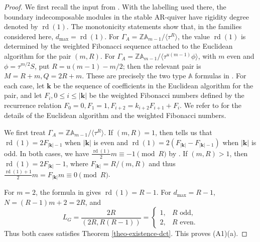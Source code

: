 \documentclass[12pt]{article}
\theoremstyle{plain}
\theoremstyle{definition}
\DeclareMathOperator{\rd}{rd}
\renewcommand{\leq}{\leqslant}
\begin{document}
\begin{proof}
We first recall the input from \cite{HuYinRigidityDegrees}.  With the
labelling used there, the boundary indecomposable modules in the stable
AR-quiver have rigidity degree denoted by \(\rd(1)\).  The monotonicity
statements \cite[Proposition 4.3(3), Corollary 4.7]{HuYinRigidityDegrees}
show that, in the families considered here, \(d_{\max}=\rd(1)\).  For
\(\Gamma_A=\mathbb Z\mathbb A_{m-1}/\langle\tau^R\rangle\), the value
\(\rd(1)\) is determined by the weighted Fibonacci sequence attached to the
Euclidean algorithm for the pair \((m,R)\).  For
\(\Gamma_A=\mathbb Z\mathbb A_{m-1}/
\langle\tau^{u(m-1)}\phi\rangle\), with \(m\) even and
\(\phi=\tau^{m/2}S\), put \(R=u(m-1)-m/2\); then the relevant pair is
\(
M=R+m,Q=2R+m\).
These are precisely the two type \(\mathbb A\) formulas in
\cite[Theorem 4.1]{HuYinRigidityDegrees}. For each case, let $\mathbf{k}$ be the sequence of coefficients in the Euclidean algorithm for the pair, and let \(F_i, 0\leq i\leq |\mathbf{k}|\) be the weighted Fibonacci numbers defined by the recurrence relation \(F_0=0, F_1=1, F_{i+2}=k_{i+2}F_{i+1}+F_i\). We refer to \cite{HuYinRigidityDegrees} for the details of the Euclidean algorithm and the weighted Fibonacci numbers.






We first treat \(\Gamma_A=\mathbb Z\mathbb A_{m-1}/\langle\tau^R\rangle\).  If $(m,R)=1$,  then \cite[Theorem 4.1]{HuYinRigidityDegrees} tells us that \(\rd(1)=2F_{|\mathbf{k}|-1}\) when $|\mathbf{k}|$ is even and \(\rd(1)=2(F_{|\mathbf{k}|}-F_{|\mathbf{k}|-1})\) when $|\mathbf{k}|$ is odd. In both cases, we have  \(\frac{\rd(1)}{2}m\equiv -1\pmod{R}\) by  \cite[Proposition 3.4]{HuYinRigidityDegrees}. If \((m,R)>1\), then \(\rd(1)=2F_{|\mathbf{k}|}-1\), where $F_{|\mathbf{k}|}=R/(m,R)$ and thus \(\frac{\rd(1)+1}{2}m=F_{|\mathbf{k}|}m\equiv 0\pmod{R}\). 









For \(m=2\), the formula in \cite[Theorem 4.1]{HuYinRigidityDegrees} gives
\(\rd(1)=R-1\). For $d_{\max}=R-1$, $N=(R-1)m+2=2R$, and 
\[
L_G=\frac{2R}{(2R,R(R-1))}=
\begin{cases}
1,&R\text{ odd},\\
2,&R\text{ even}.
\end{cases}
\]
Thus both cases satisfies Theorem \ref{theo-existence-dct}.  This proves
(A1)(a).


\end{proof}
\end{document}
